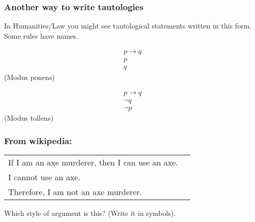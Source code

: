 \documentclass[10pt]{beamer}
\newcommand{\ra}{\to} %
\theoremstyle{definition}
\begin{document}
\begin{frame}
\frametitle{Another way to write tautologies}


In Humanities/Law you might see tautological statements written in this form. Some rules have names.
\bigskip

 \[\begin{array}{lll}
 p\ra q\\
 p\\
 \hline
 q
\end{array}\]
(Modus ponens)

\bigskip\pause
 \[\begin{array}{lll}
 p\ra q\\
\neg q\\
 \hline
 \neg p
\end{array}\]
(Modus tollens)



\vspace{2cm}
\vfill
\end{frame}




\begin{frame}
\frametitle{From wikipedia: }




\begin{tabular}{ll} 
If I am an axe murderer, then I can use an axe.\\
I cannot use an axe.\\
Therefore, I am not an axe murderer.\end{tabular}

\bigskip

Which style of argument is this? (Write it in symbols).

\vspace{2cm}
\vfill
\end{frame}




\end{document}
